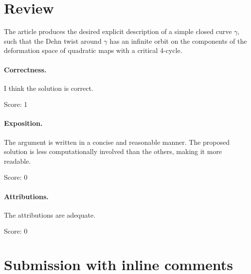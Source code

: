 \documentclass[11pt]{article}
\theoremstyle{definition}
\theoremstyle{remark}
\begin{document}
\maketitle

\section{Review}
The article produces the desired explicit description of a simple closed curve $\gamma$, such that the Dehn twist around $\gamma$ has an infinite orbit on the components of the deformation space of quadratic maps with a critical 4-cycle. 

\paragraph{Correctness.}

 I think the solution is correct. 

\noindent Score: 1

\paragraph{Exposition.}

The argument is written in a concise and reasonable manner. The proposed solution is less computationally involved than the others, making it more readable.


\noindent Score: 0

\paragraph{Attributions.}

The attributions are adequate. 

\noindent Score: 0


\newpage
\section{Submission with inline comments}


\begin{abstract}
We describe a simple closed curve for which the Dehn twist itself,
not merely a proper power, preserves the deformation space in the
question and has an infinite orbit on its connected components.
The curve is first specified for one explicit normalized rational map
and is then transported to an arbitrary map in the family.
The proof uses an explicit Hurwitz covering and a free-group quotient
of the stabilizer of a component.  It does not assume that the
components of the deformation space are simply connected.
\end{abstract}
\end{document}
